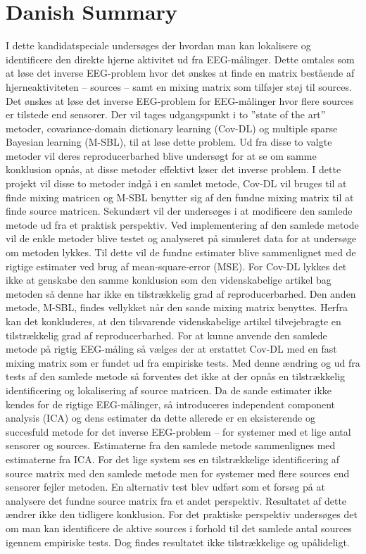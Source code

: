 \chapter*{Danish Summary}
I dette kandidatspeciale undersøges der hvordan man kan lokalisere og identificere den direkte hjerne aktivitet ud fra EEG-målinger. Dette omtales som at løse det inverse EEG-problem hvor det ønskes at finde en matrix bestående af hjerneaktiviteten – sources – samt en mixing matrix som tilføjer støj til sources. Det ønskes at løse det inverse EEG-problem for EEG-målinger hvor flere sources er tilstede end sensorer.  Der vil tages udgangspunkt i to ”state of the art” metoder, covariance-domain dictionary learning (Cov-DL) og multiple sparse Bayesian learning (M-SBL), til at løse dette problem. Ud fra disse to valgte metoder vil deres reproducerbarhed blive undersøgt for at se om samme konklusion opnås, at disse metoder effektivt løser det inverse problem. I dette projekt vil disse to metoder indgå i en samlet metode, Cov-DL vil bruges til at finde mixing matricen og M-SBL benytter sig af den fundne mixing matrix til at finde source matricen. Sekundært vil der undersøges i at modificere den samlede metode ud fra et praktisk perspektiv.
Ved implementering af den samlede metode vil de enkle metoder blive testet og analyseret på simuleret data for at undersøge om metoden lykkes. Til dette vil de fundne estimater blive sammenlignet med de rigtige estimater ved brug af mean-square-error (MSE). For Cov-DL lykkes det ikke at genskabe den samme konklusion som den videnskabelige artikel bag metoden så denne har ikke en tilstrækkelig grad af reproducerbarhed. Den anden metode, M-SBL, findes vellykket når den sande mixing matrix benyttes. Herfra kan det konkluderes, at den tilsvarende videnskabelige artikel tilvejebragte en tilstrækkelig grad af reproducerbarhed.
For at kunne anvende den samlede metode på rigtig EEG-måling så vælges der at erstattet Cov-DL med en fast mixing matrix som er fundet ud fra empiriske tests. Med denne ændring og ud fra tests af den samlede metode så forventes det ikke at der opnås en tilstrækkelig identificering og lokalisering af source matricen. Da de sande estimater ikke kendes for de rigtige EEG-målinger, så introduceres independent component analysis (ICA) og dens estimater da dette allerede er en eksisterende og succesfuld metode for det inverse EEG-problem – for systemer med et lige antal sensorer og sources. Estimaterne fra den samlede metode sammenlignes med estimaterne fra ICA. For det lige system ses en tilstrækkelige identificering af source matrix med den samlede metode men for systemer med flere sources end sensorer fejler metoden. En alternativ test blev udført som et forsøg på at analysere det fundne source matrix fra et andet perspektiv. Resultatet af dette ændrer ikke den tidligere konklusion.
For det praktiske perspektiv undersøges det om man kan identificere de aktive sources i forhold til det samlede antal sources igennem empiriske tests. Dog findes resultatet ikke tilstrækkelige og upålideligt.
